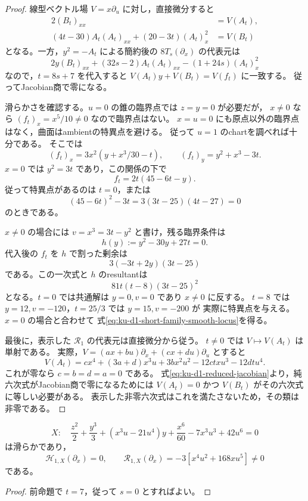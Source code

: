 \begin{proof}
線型ベクトル場 $V=x\partial_u$ に対し，直接微分すると
\begin{equation}\label{eq:ku-d1-short-null-syzygy}
 \begin{split}
 2(B_t)_{xx}&=V(A_t),\\
 (4t-30)A_t(A_t)_{xx}+(20-3t)(A_t)_x^2&=V(B_t)
 \end{split}
\end{equation}
となる。一方，$y^2=-A_t$ による簡約後の $8T_s(\partial_x)$ の代表元は
\[
 2y(B_t)_{xx}+(32s-2)A_t(A_t)_{xx}-(1+24s)(A_t)_x^2
\]
なので，$t=8s+7$ を代入すると $V(A_t)y+V(B_t)=V(f_t)$ に一致する。
従ってJacobian商で零になる。

滑らかさを確認する。$u=0$ の錐の臨界点では $z=y=0$ が必要だが，
$x\ne0$ なら $(f_t)_x=x^5/10\ne0$ なので臨界点はない。
$x=u=0$ にも原点以外の臨界点はなく，曲面はambientの特異点を避ける。
従って $u=1$ のchartを調べれば十分である。
そこでは
\[
 (f_t)_x=3x^2\left(y+x^3/30-t\right),\qquad
 (f_t)_y=y^2+x^3-3t.
\]
$x=0$ では $y^2=3t$ であり，この関係の下で
\[
                  f_t=2t(45-6t-y).
\]
従って特異点があるのは $t=0$，または
\[
            (45-6t)^2-3t=3(3t-25)(4t-27)=0
\]
のときである。

$x\ne0$ の場合には $v=x^3=3t-y^2$ と書け，残る臨界条件は
\[
 h(y):=y^2-30y+27t=0.
\]
代入後の $f_t$ を $h$ で割った剰余は
\[
                    3(-3t+2y)(3t-25)
\]
である。この一次式と $h$ のresultantは
\[
                       81t(t-8)(3t-25)^2
\]
となる。$t=0$ では共通解は $y=0,v=0$ であり $x\ne0$ に反する。
$t=8$ では $y=12,v=-120$，$t=25/3$ では $y=15,v=-200$ が
実際に特異点を与える。$x=0$ の場合と合わせて
式\eqref{eq:ku-d1-short-family-smooth-locus}を得る。

最後に，表示した $\mathcal R_1$ の代表元は直接微分から従う。
$t\ne0$ では $V\mapsto V(A_t)$ は単射である。
実際，$V=(a x+b u)\partial_x+(c x+d u)\partial_u$ とすると
\[
 V(A_t)=c x^4+(3a+d)x^3u+3b x^2u^2-12ct xu^3-12dt u^4.
\]
これが零なら $c=b=d=a=0$ である。
式\eqref{eq:ku-d1-reduced-jacobian}より，純六次式がJacobian商で零になるためには
$V(A_t)=0$ かつ $V(B_t)$ がその六次式に等しい必要がある。
表示した非零六次式はこれを満たさないため，その類は非零である。
\end{proof}

\begin{corollary}[Hessian候補を判別する短い滑らかな例]
\label{cor:ku-d1-short-hessian-null}
\[
 X:\quad \frac{z^2}{2}+\frac{y^3}{3}
 +(x^3u-21u^4)y+\frac{x^6}{60}-7x^3u^3+42u^6=0
\]
は滑らかであり，
\[
 \mathcal H_{1,X}(\partial_x)=0,
 \qquad
 \mathcal R_{1,X}(\partial_x)=-3[x^4u^2+168xu^5]\ne0
\]
である。
\end{corollary}
\begin{proof}
前命題で $t=7$，従って $s=0$ とすればよい。
\end{proof}

